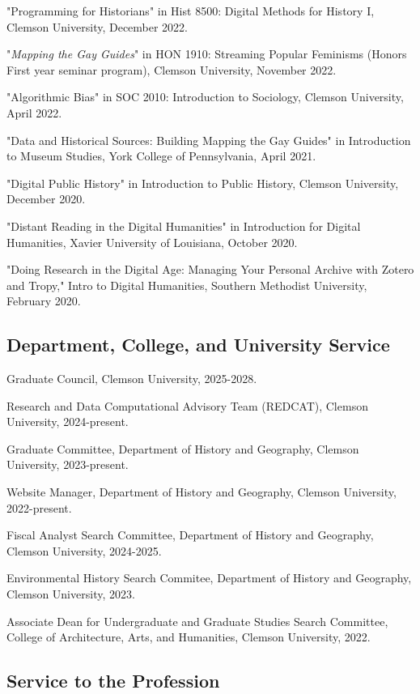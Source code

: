 \documentclass[11pt]{article}
\begin{document}
"Programming for Historians" in Hist 8500: Digital Methods for History I, Clemson University, December 2022.

"\emph{Mapping the Gay Guides}" in HON 1910: Streaming Popular Feminisms (Honors First year seminar program), Clemson University, November 2022. 

"Algorithmic Bias" in SOC 2010: Introduction to Sociology, Clemson University, April 2022.

"Data and Historical Sources: Building Mapping the Gay Guides" in Introduction to Museum Studies, York College of Pennsylvania, April 2021.

"Digital Public History" in Introduction to Public History, Clemson University, December 2020.

"Distant Reading in the Digital Humanities" in Introduction for Digital Humanities, Xavier University of Louisiana, October 2020.

"Doing Research in the Digital Age: Managing Your Personal Archive with Zotero and Tropy," Intro to Digital Humanities, Southern Methodist University, February 2020.

\subsection{Department, College, and University Service}\label{Department, College, and University Service}

Graduate Council, Clemson University, 2025-2028.

Research and Data Computational Advisory Team (REDCAT), Clemson University, 2024-present.

Graduate Committee, Department of History and Geography, Clemson University, 2023-present.

Website Manager, Department of History and Geography, Clemson University, 2022-present.

Fiscal Analyst Search Committee, Department of History and Geography, Clemson University, 2024-2025.

Environmental History Search Commitee, Department of History and Geography, Clemson University, 2023.

Associate Dean for Undergraduate and Graduate Studies Search Committee, College of Architecture, Arts, and Humanities, Clemson University, 2022.

\subsection{Service to the Profession}\label{Other Professional and Community Service}
\end{document}

